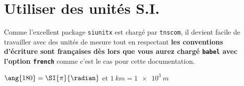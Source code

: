 \documentclass[12pt,a4paper]{article}
\begin{document}
\section{Utiliser des unités S.I.}

Comme l'excellent package \verb#siunitx# est chargé par \verb+tnscom+, il devient facile de travailler avec des unités de mesure tout en respectant \textbf{les conventions d'écriture sont françaises dès lors que vous aurez chargé \texttt{babel} avec l'option \texttt{french}} comme c'est le cas pour cette documentation.

\begin{latexex}
$\ang{180} = \SI{\pi}{\radian}$
et
$\SI{1}{km} = \SI{1e3}{m}$
\end{latexex}
\end{document}

